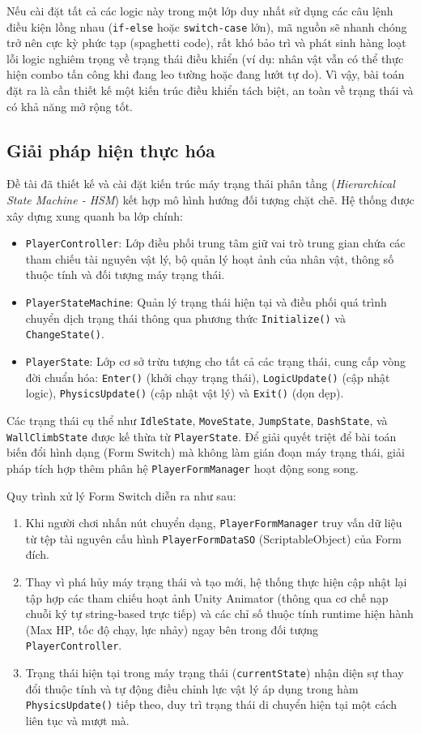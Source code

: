 Nếu cài đặt tất cả các logic này trong một lớp duy nhất sử dụng các câu lệnh điều kiện lồng nhau (\texttt{if-else} hoặc \texttt{switch-case} lớn), mã nguồn sẽ nhanh chóng trở nên cực kỳ phức tạp (spaghetti code), rất khó bảo trì và phát sinh hàng loạt lỗi logic nghiêm trọng về trạng thái điều khiển (ví dụ: nhân vật vẫn có thể thực hiện combo tấn công khi đang leo tường hoặc đang lướt tự do). Vì vậy, bài toán đặt ra là cần thiết kế một kiến trúc điều khiển tách biệt, an toàn về trạng thái và có khả năng mở rộng tốt.

\subsection{Giải pháp hiện thực hóa}
Đề tài đã thiết kế và cài đặt kiến trúc máy trạng thái phân tầng (\textit{Hierarchical State Machine - HSM}) kết hợp mô hình hướng đối tượng chặt chẽ. Hệ thống được xây dựng xung quanh ba lớp chính:
\begin{itemize}
    \item \texttt{PlayerController}: Lớp điều phối trung tâm giữ vai trò trung gian chứa các tham chiếu tài nguyên vật lý, bộ quản lý hoạt ảnh của nhân vật, thông số thuộc tính và đối tượng máy trạng thái.
    \item \texttt{PlayerStateMachine}: Quản lý trạng thái hiện tại và điều phối quá trình chuyển dịch trạng thái thông qua phương thức \texttt{Initialize()} và \texttt{Change\-State()}.
    \item \texttt{PlayerState}: Lớp cơ sở trừu tượng cho tất cả các trạng thái, cung cấp vòng đời chuẩn hóa: \texttt{Enter()} (khởi chạy trạng thái), \texttt{LogicUpdate()} (cập nhật logic), \texttt{PhysicsUpdate()} (cập nhật vật lý) và \texttt{Exit()} (dọn dẹp).
\end{itemize}

Các trạng thái cụ thể như \texttt{IdleState}, \texttt{MoveState}, \texttt{JumpState}, \texttt{DashState}, và \texttt{WallClimbState} được kế thừa từ \texttt{PlayerState}. Để giải quyết triệt để bài toán biến đổi hình dạng (Form Switch) mà không làm gián đoạn máy trạng thái, giải pháp tích hợp thêm phân hệ \texttt{PlayerFormManager} hoạt động song song.

Quy trình xử lý Form Switch diễn ra như sau:
\begin{enumerate}
    \item Khi người chơi nhấn nút chuyển dạng, \texttt{PlayerFormManager} truy vấn dữ liệu từ tệp tài nguyên cấu hình \texttt{PlayerFormDataSO} (ScriptableObject) của Form đích.
    \item Thay vì phá hủy máy trạng thái và tạo mới, hệ thống thực hiện cập nhật lại tập hợp các tham chiếu hoạt ảnh Unity Animator (thông qua cơ chế nạp chuỗi ký tự string-based trực tiếp) và các chỉ số thuộc tính runtime hiện hành (Max HP, tốc độ chạy, lực nhảy) ngay bên trong đối tượng \texttt{PlayerController}.
    \item Trạng thái hiện tại trong máy trạng thái (\texttt{currentState}) nhận diện sự thay đổi thuộc tính và tự động điều chỉnh lực vật lý áp dụng trong hàm \texttt{PhysicsUpdate()} tiếp theo, duy trì trạng thái di chuyển hiện tại một cách liên tục và mượt mà.
\end{enumerate}

